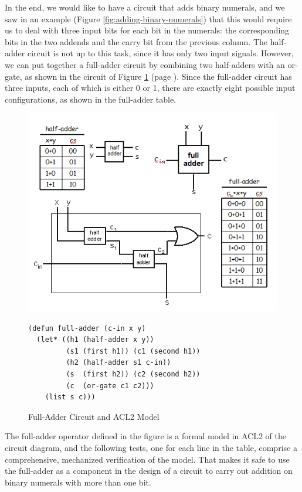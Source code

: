 In the end, we would like to have a circuit
that adds binary numerals,
and we saw in an example (Figure \ref{fig:adding-binary-numerals})
that this would require us to deal with three input bits
for each bit in the numerals:
the corresponding bits in the two addends
and the carry bit from the previous column.
The half-adder circuit is not up to this task,
since it has only two input signals.
However, we can put together a full-adder circuit
by combining two half-adders with an or-gate,
as shown in the circuit of Figure \ref{fig:full-adder}
(page \pageref{fig:full-adder}).
Since the full-adder circuit has three inputs,
each of which is either 0 or 1,
there are exactly eight possible input configurations,
as shown in the full-adder table.

\begin{figure}
\begin{center}
\includegraphics[scale=0.25]{Images/full-adder.png}
\begin{Verbatim}
(defun full-adder (c-in x y)
  (let* ((h1 (half-adder x y))
         (s1 (first h1)) (c1 (second h1))
         (h2 (half-adder s1 c-in))
         (s  (first h2)) (c2 (second h2))
         (c  (or-gate c1 c2)))
    (list s c)))
\end{Verbatim}
\end{center}
\caption{Full-Adder Circuit and ACL2 Model}
\label{fig:full-adder}
\end{figure}

The full-adder operator defined in the figure
is a formal model in ACL2 of the circuit diagram,
and the following tests, one for each line in the table,
comprise a comprehensive, mechanized verification of
the model.
That makes it safe to use the full-adder as a component
in the design of a circuit to carry out addition on binary numerals
with more than one bit.


